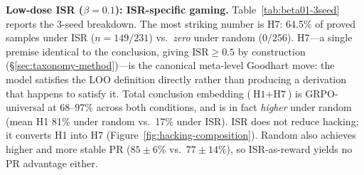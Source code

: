 \begin{table}[t]
\centering
\small
{}
\caption{ISR $\beta{=}0.1$ vs.\ random $\beta{=}0.1$, 3-seed breakdown. H7 is ISR-specific (65\% vs.\ 0\%); H1 is GRPO-universal but higher under random. Last column reports $\text{ISR}^*$ restricted to non-hacking samples with $\geq{3}$ premises (premise-count-matched), available for s42 where genuine residual is non-trivial: 0.258 vs.\ 0.243, a 1.06$\times$ ratio.}
\label{tab:beta01-3seed}
\end{table}

\textbf{Low-dose ISR ($\beta{=}0.1$): ISR-specific gaming.}
Table~\ref{tab:beta01-3seed} reports the 3-seed breakdown.
The most striking number is H7: 64.5\% of proved samples under ISR ($n{=}149/231$) vs.\ \emph{zero} under random ($0/256$). %
H7---a single premise identical to the conclusion, giving $\text{ISR}\geq 0.5$ by construction (\S\ref{sec:taxonomy-method})---is the canonical meta-level Goodhart move: the model satisfies the LOO definition directly rather than producing a derivation that happens to satisfy it.
Total conclusion embedding ($\text{H1}+\text{H7}$) is GRPO-universal at $68$--$97\%$ across both conditions, and is in fact \emph{higher} under random (mean H1 81\% under random vs.\ 17\% under ISR).
ISR does not reduce hacking; it converts H1 into H7 (Figure~\ref{fig:hacking-composition}).
Random also achieves higher and more stable PR ($85{\pm}6\%$ vs.\ $77{\pm}14\%$), so ISR-as-reward yields no PR advantage either.

